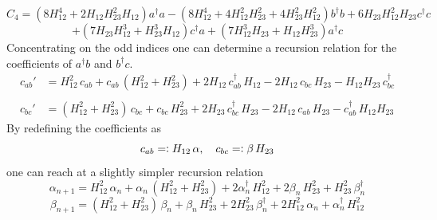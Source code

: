 $$ C_4 = (8 H_{12}^4 + 2 H_{12} H_{23}^2 H_{12}) a^\dagger a - \left(8 H_{12}^4 + 4 H_{12}^2 H_{23}^2 + 4 H_{23}^2 H_{12}^2 \right) b^\dagger b + 6 H_{23} H_{12}^2 H_{23} c^\dagger c  $$$$+ (7 H_{23} H_{12}^3 + H_{23}^3 H_{12}) c^\dagger a + (7 H_{12}^3 H_{23} + H_{12} H_{23}^3) a^\dagger c$$
Concentrating on the odd indices one can determine a recursion relation for the coefficients of $a^\dagger b$ and $b^\dagger c$. 
\begin{align*}
    c_{ab}'&=H_{12}^2\,c_{ab}+c_{ab}\,(H_{12}^2+H_{23}^2)+2H_{12}\,c_{ab}^\dagger \,H_{12}-2H_{12}\,c_{bc}\,H_{23}-H_{12}H_{23}\,c_{bc}^\dagger  \\\\
    c_{bc}'&=(H_{12}^2+H_{23}^2)\,c_{bc}+c_{bc}\,H_{23}^2+2H_{23}\,c_{bc}^\dagger \,H_{23}-2H_{12}\,c_{ab}\,H_{23}-c_{ab}^\dagger\, H_{12}H_{23} 
\end{align*}
By redefining the coefficients as
$$c_{ab}=\vcentcolon H_{12}\,\alpha  ,\quad c_{bc}=\vcentcolon \beta\,H_{23}$$
one can reach at a slightly simpler recursion relation
$$\alpha_{n+1}=H_{12}^2\,\alpha_n +\alpha_n \,(H_{12}^2+H_{23}^2)+2\alpha_n ^\dagger \,H_{12}^2+2\beta_n\,H_{23}^2+H_{23}^2\,\beta_n^\dagger$$
$$\beta_{n+1} = (H_{12}^2+H_{23}^2)\,\beta_n + \beta_n\, H_{23}^2 + 2H_{23}^2\,\beta_n^\dagger + 2H_{12}^2\,\alpha_n + \alpha_n^\dagger\, H_{12}^2$$

